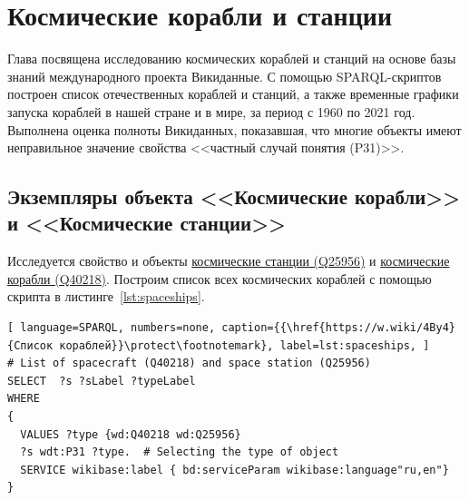 \chapter{Космические корабли и станции}
\label{ch:spacecraft-space-station}

Глава посвящена исследованию космических кораблей и станций на основе базы знаний международного проекта Викиданные. С помощью SPARQL-скриптов построен список отечественных кораблей и станций, а также временные графики запуска кораблей в нашей стране и в мире, за период с 1960 по 2021 год. Выполнена оценка полноты Викиданных, показавшая, что многие объекты имеют неправильное значение свойства <<частный случай понятия (P31)>>.
\section{Экземпляры объекта <<Космические корабли>> и <<Космические станции>>}
Исследуется свойство  и объекты \href{https://www.wikidata.org/wiki/Q25956}{космические станции (Q25956)} и \href{https://www.wikidata.org/wiki/Q40218}{космические корабли (Q40218)}.
Построим список всех космических кораблей с помощью скрипта в листинге~\ref{lst:spaceships}.

\begin{lstlisting}[ language=SPARQL, numbers=none, caption={{\href{https://w.wiki/4By4}{Список кораблей}}\protect\footnotemark}, label=lst:spaceships, ]
# List of spaceсraft (Q40218) and space station (Q25956)
SELECT  ?s ?sLabel ?typeLabel
WHERE
{
  VALUES ?type {wd:Q40218 wd:Q25956}
  ?s wdt:P31 ?type.  # Selecting the type of object
  SERVICE wikibase:label { bd:serviceParam wikibase:language"ru,en"}
}
\end{lstlisting}
